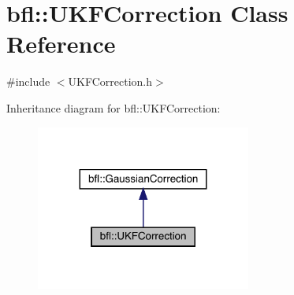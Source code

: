 \hypertarget{classbfl_1_1UKFCorrection}{}\section{bfl\+:\+:U\+K\+F\+Correction Class Reference}
\label{classbfl_1_1UKFCorrection}


{\ttfamily \#include $<$U\+K\+F\+Correction.\+h$>$}



Inheritance diagram for bfl\+:\+:U\+K\+F\+Correction\+:
\nopagebreak
\begin{figure}[H]
\begin{center}
\leavevmode
\includegraphics[width=200pt]{classbfl_1_1UKFCorrection__inherit__graph}
\end{center}
\end{figure}
